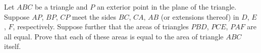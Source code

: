 Let $ABC$ be a triangle and $P$ an exterior point in the plane of the triangle. Suppose $AP$, $BP$, $CP$ meet the sides $BC$, $CA$, $AB$ (or extensions thereof) in $D$, $E$, $F$, respectively. Suppose further that the areas of triangles $PBD$, $PCE$, $PAF$ are all equal. Prove that each of these areas is equal to the area of triangle $ABC$ itself.
